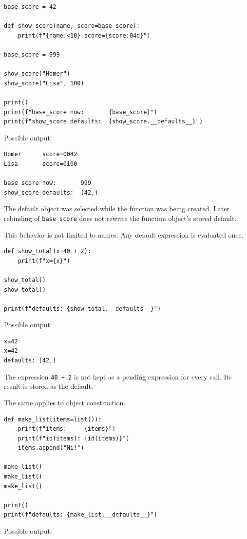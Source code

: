 \begin{verbatim}
base_score = 42

def show_score(name, score=base_score):
    print(f"{name:<10} score={score:04d}")

base_score = 999

show_score("Homer")
show_score("Lisa", 100)

print()
print(f"base_score now:       {base_score}")
print(f"show_score defaults:  {show_score.__defaults__}")
\end{verbatim}

Possible output:

\begin{verbatim}
Homer      score=0042
Lisa       score=0100

base_score now:       999
show_score defaults:  (42,)
\end{verbatim}

The default object was selected while the function was being created. Later rebinding of \texttt{base\_score} does not rewrite the function object's stored default.

This behavior is not limited to names. Any default expression is evaluated once.

\begin{verbatim}
def show_total(x=40 + 2):
    print(f"x={x}")

show_total()
show_total()

print(f"defaults: {show_total.__defaults__}")
\end{verbatim}

Possible output:

\begin{verbatim}
x=42
x=42
defaults: (42,)
\end{verbatim}

The expression \texttt{40 + 2} is not kept as a pending expression for every call. Its result is stored as the default.

The same applies to object construction.

\begin{verbatim}
def make_list(items=list()):
    print(f"items:     {items}")
    print(f"id(items): {id(items)}")
    items.append("Ni!")

make_list()
make_list()
make_list()

print()
print(f"defaults: {make_list.__defaults__}")
\end{verbatim}

Possible output:


